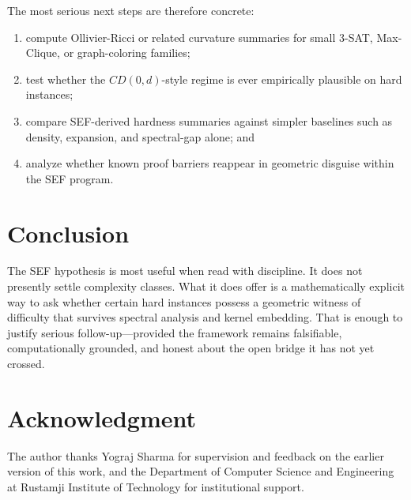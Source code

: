 \documentclass{svjour3}
\begin{document}
The most serious next steps are therefore concrete:
\begin{enumerate}[leftmargin=*]
\item compute Ollivier-Ricci or related curvature summaries for small 3-SAT, Max-Clique, or graph-coloring families;
\item test whether the $CD(0,d)$-style regime is ever empirically plausible on hard instances;
\item compare SEF-derived hardness summaries against simpler baselines such as density, expansion, and spectral-gap alone; and
\item analyze whether known proof barriers reappear in geometric disguise within the SEF program.
\end{enumerate}

\section{Conclusion}
The SEF hypothesis is most useful when read with discipline. It does not presently settle complexity classes. What it does offer is a mathematically explicit way to ask whether certain hard instances possess a geometric witness of difficulty that survives spectral analysis and kernel embedding. That is enough to justify serious follow-up---provided the framework remains falsifiable, computationally grounded, and honest about the open bridge it has not yet crossed.

\section*{Acknowledgment}
The author thanks Yograj Sharma for supervision and feedback on the earlier version of this work, and the Department of Computer Science and Engineering at Rustamji Institute of Technology for institutional support.



\end{document}
